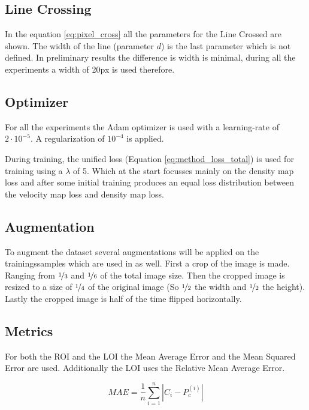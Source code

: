 \subsection{Line Crossing}
In the equation \ref{eq:pixel_cross} all the parameters for the Line Crossed are shown. The width of the line (parameter $d$) is the last parameter which is not defined. In preliminary results the difference is width is minimal, during all the experiments a width of 20px is used therefore.


\subsection{Optimizer}
For all the experiments the Adam optimizer \cite{Kingma2015} is used with a learning-rate of $2\cdot 10^{-5}$. A regularization of $10^{-4}$ is applied.

During training, the unified loss (Equation \ref{eq:method_loss_total}) is used for training using a $\lambda$ of 5. Which at the start focusses mainly on the density map loss and after some initial training produces an equal loss distribution between the velocity map loss and density map loss.

\subsection{Augmentation}
To augment the dataset several augmentations will be applied on the trainingssamples which are used in \cite{li2018csrnet} as well. First a crop of the image is made. Ranging from $\nicefrac{1}{3}$ and $\nicefrac{1}{6}$ of the total image size. Then the cropped image is resized to a size of $\nicefrac{1}{4}$ of the original image (So $\nicefrac{1}{2}$ the width and $\nicefrac{1}{2}$ the height). Lastly the cropped image is half of the time flipped horizontally.

\subsection{Metrics}
For both the ROI and the LOI the Mean Average Error and the Mean Squared Error are used. Additionally the LOI uses the Relative Mean Average Error.

\begin{equation}
\label{eq:mae_roi}
	MAE = \frac{1}{n}\sum^n_{i=1}|C_i-P_c^{(i)}|
\end{equation}

